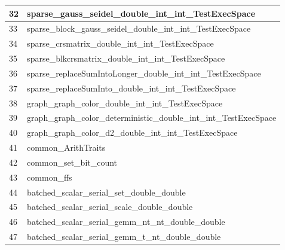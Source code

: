 \begin{table}[!htbp]
{\begin{tabular}{|>{\columncolor[HTML]{34FF34}}l |l|}
            \cellcolor[HTML]{FF00FF}32 & sparse\_gauss\_seidel\_double\_int\_int\_TestExecSpace              \\ \hline
            \cellcolor[HTML]{FF00FF}33 & sparse\_block\_gauss\_seidel\_double\_int\_int\_TestExecSpace       \\ \hline
            \cellcolor[HTML]{FF00FF}34 & sparse\_crsmatrix\_double\_int\_int\_TestExecSpace                  \\ \hline
            \cellcolor[HTML]{FF00FF}35 & sparse\_blkcrsmatrix\_double\_int\_int\_TestExecSpace               \\ \hline
            \cellcolor[HTML]{FF00FF}36 & sparse\_replaceSumIntoLonger\_double\_int\_int\_TestExecSpace       \\ \hline
            \cellcolor[HTML]{FF00FF}37 & sparse\_replaceSumInto\_double\_int\_int\_TestExecSpace             \\ \hline
            \cellcolor[HTML]{FF00FF}38 & graph\_graph\_color\_double\_int\_int\_TestExecSpace                \\ \hline
            \cellcolor[HTML]{FF00FF}39 & graph\_graph\_color\_deterministic\_double\_int\_int\_TestExecSpace \\ \hline
            \cellcolor[HTML]{FF00FF}40 & graph\_graph\_color\_d2\_double\_int\_int\_TestExecSpace            \\ \hline
            \cellcolor[HTML]{FF00FF}41 & common\_ArithTraits                                                 \\ \hline
            42                         & common\_set\_bit\_count                                             \\ \hline
            43                         & common\_ffs                                                         \\ \hline
            \cellcolor[HTML]{FE0000}44 & batched\_scalar\_serial\_set\_double\_double                        \\ \hline
            \cellcolor[HTML]{FE0000}45 & batched\_scalar\_serial\_scale\_double\_double                      \\ \hline
            \cellcolor[HTML]{FE0000}46 & batched\_scalar\_serial\_gemm\_nt\_nt\_double\_double               \\ \hline
            \cellcolor[HTML]{D1B3FF}47 & batched\_scalar\_serial\_gemm\_t\_nt\_double\_double                \\ \hline
            \end{tabular}

}
\end{table}
